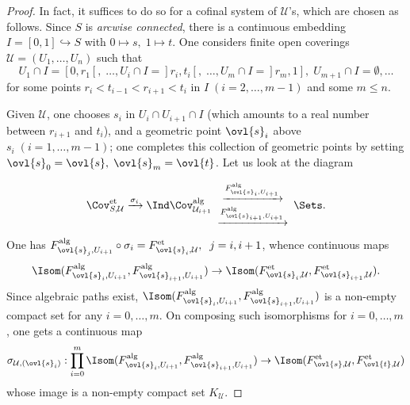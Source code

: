 \begin{proof}
 In fact, it suffices to do so for a cofinal system of $\mathcal{U}$'s,
 which are chosen as follows. Since $S$ is {\it arcwise connected}, there
 is a continuous embedding $I=[0,1]\hookrightarrow S$ with $0\mapsto
 s,\;1\mapsto t$.
 One considers finite open coverings $\mathcal{U} =(U_1,\ldots, U_n)$
 such that
 \begin{equation*}
 U_1\cap I = [0,r_1[,\;\ldots, U_i\cap I=]r_i,t_i[,\;\ldots, U_m\cap
  I=]r_m,1],\;U_{m+1}\cap 
  I=\emptyset,\ldots
 \end{equation*}
 \noindent for some points $r_i<t_{i-1}<r_{i+1}<t_i$ in $I \;(i=2,\ldots,
 m-1)$ and some $ m\leq n$.

 Given $\mathcal{U}$, one chooses $s_i$ in $U_i\cap U_{i+1}\cap I$ (which
 amounts to a real number between $r_{i+1}$ and $t_i$), and a geometric
 point $\ovl{s}_i$ above $s_i\; (i=1,\ldots, m-1)$; one completes this
 collection of geometric points by setting $\ovl{s}_0=\ovl{s},\;
 \ovl{s}_m=\ovl{t}$.  Let us look at the diagram

 \begin{equation*}
 \Cov^{\mathrm{et}}_{S,\mathcal{U}}
 \xrightarrow{\sigma_i}
 \Ind \Cov^{\mathrm{alg}}_{\mathcal{U}_{i+1}}
 \begin{array}{c}
  \xrightarrow{F^{\mathrm{alg}}_{\ovl{s}_i, U_{i+1}}}\\
  \xrightarrow{F^{\mathrm{alg}}_{\ovl{s}_{i+1}, U_{i+1}}}\\
 \end{array}
 \Sets.
 \end{equation*}               
 One has $F^{\mathrm{alg}}_{\ovl{s}_j, U_{i+1}}\circ \sigma_i =
 F^{\mathrm{et}}_{\ovl{s}_i, \mathcal{U} },\;\;j=i,i+1$, whence
 continuous maps 
 \begin{equation*}
 \Isom(F^{\mathrm{alg}}_{\ovl{s}_i,
 U_{i+1}},F^{\mathrm{alg}}_{\ovl{s}_{i+1}, U_{i+1}})\to
 \Isom(F^{\mathrm{et}}_{\ovl{s}_i, \mathcal{U}
 },F^{\mathrm{et}}_{\ovl{s}_{i+1}, \mathcal{U}}).
 \end{equation*} 
 Since algebraic paths exist, $\Isom(F^{\mathrm{alg}}_{\ovl{s}_i,
 U_{i+1}},F^{\mathrm{alg}}_{\ovl{s}_{i+1}, U_{i+1}})$ is a non-empty
 compact set for any $i=0,\ldots, m$.  On composing such isomorphisms for
 $i=0,\ldots, m$, one gets a continuous map
 \begin{equation*}
 \sigma_{\mathcal{U},(\ovl{s}_i)}: \prod_{i=0}^m
  \Isom(F^{\mathrm{alg}}_{\ovl{s}_{i},
  U_{i+1}},F^{\mathrm{alg}}_{\ovl{s}_{i+1}, U_{i+1}})\to
  \Isom(F^{\mathrm{et}}_{\ovl{s},\mathcal{U}},
  F^{\mathrm{et}}_{\ovl{t},\mathcal{U}})
 \end{equation*} 
 whose image is a non-empty compact set $K_\mathcal{U}$.


\end{proof}
